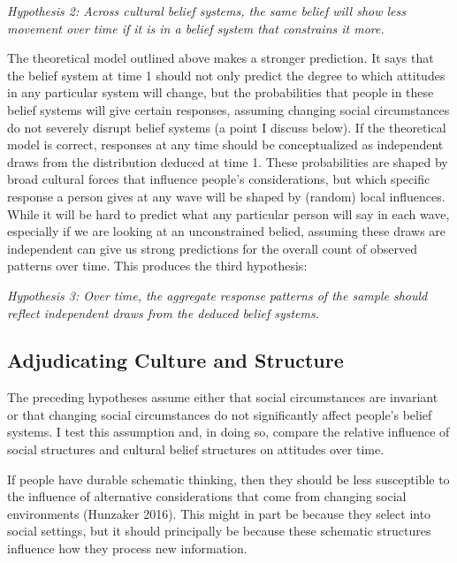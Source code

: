\documentclass[12pt,]{article}
\begin{document}
\emph{Hypothesis 2: Across cultural belief systems, the same belief will show less movement over time if it is in a belief system that constrains it more.}

The theoretical model outlined above makes a stronger prediction. It says that the belief system at time 1 should not only predict the degree to which attitudes in any particular system will change, but the probabilities that people in these belief systems will give certain responses, assuming changing social circumstances do not severely disrupt belief systems (a point I discuss below). If the theoretical model is correct, responses at any time should be conceptualized as independent draws from the distribution deduced at time 1. These probabilities are shaped by broad cultural forces that influence people's considerations, but which specific response a person gives at any wave will be shaped by (random) local influences. While it will be hard to predict what any particular person will say in each wave, especially if we are looking at an unconstrained belied, assuming these draws are independent can give us strong predictions for the overall count of observed patterns over time. This produces the third hypothesis:

\emph{Hypothesis 3: Over time, the aggregate response patterns of the sample should reflect independent draws from the deduced belief systems.}

\hypertarget{adjudicating-culture-and-structure}{%
\subsection{Adjudicating Culture and Structure}\label{adjudicating-culture-and-structure}}

The preceding hypotheses assume either that social circumstances are invariant or that changing social circumstances do not significantly affect people's belief systems. I test this assumption and, in doing so, compare the relative influence of social structures and cultural belief structures on attitudes over time.

If people have durable schematic thinking, then they should be less susceptible to the influence of alternative considerations that come from changing social environments (Hunzaker 2016). This might in part be because they select into social settings, but it should principally be because these schematic structures influence how they process new information.
\end{document}
